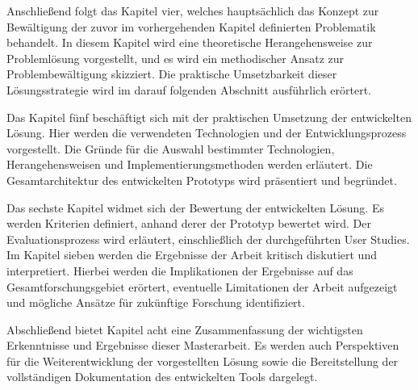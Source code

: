 Anschließend folgt das Kapitel vier, welches hauptsächlich das Konzept zur Bewältigung der zuvor im vorhergehenden Kapitel definierten Problematik behandelt. In diesem Kapitel wird eine theoretische Herangehensweise zur Problemlösung vorgestellt, und es wird ein methodischer Ansatz zur Problembewältigung skizziert. Die praktische Umsetzbarkeit dieser Lösungsstrategie wird im darauf folgenden Abschnitt ausführlich erörtert.

Das Kapitel fünf beschäftigt sich mit der praktischen Umsetzung der entwickelten Lösung. Hier werden die verwendeten Technologien und der Entwicklungsprozess vorgestellt. Die Gründe für die Auswahl bestimmter Technologien, Herangehensweisen und Implementierungsmethoden werden erläutert. Die Gesamtarchitektur des entwickelten Prototyps wird präsentiert und begründet.

Das sechste Kapitel widmet sich der Bewertung der entwickelten Lösung. Es werden Kriterien definiert, anhand derer der Prototyp bewertet wird. Der Evaluationsprozess wird erläutert, einschließlich der durchgeführten User Studies. Im Kapitel sieben werden die Ergebnisse der Arbeit kritisch diskutiert und interpretiert. Hierbei werden die Implikationen der Ergebnisse auf das Gesamtforschungsgebiet erörtert, eventuelle Limitationen der Arbeit aufgezeigt und mögliche Ansätze für zukünftige Forschung identifiziert.

Abschließend bietet Kapitel acht eine Zusammenfassung der wichtigsten Erkenntnisse und Ergebnisse dieser Masterarbeit. Es werden auch Perspektiven für die Weiterentwicklung der vorgestellten Lösung sowie die Bereitstellung der vollständigen Dokumentation des entwickelten Tools dargelegt.